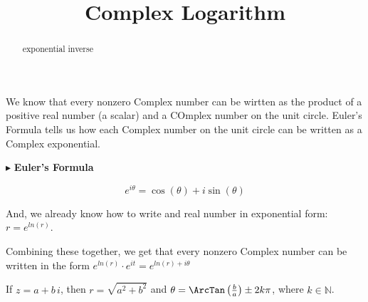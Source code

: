 \documentclass{ximera}
\title{Complex Logarithm}
\begin{document}
\begin{abstract}
exponential inverse
\end{abstract}
\maketitle





We know that every nonzero Complex number can be wirtten as the product of a positive real number (a scalar) and a COmplex number on the unit circle.  Euler's Formula tells us how each Complex number on the unit circle can be written as a Complex exponential.


$\blacktriangleright$ \textbf{Euler's Formula}


\[   e^{i \theta} = \cos(\theta) + i \sin(\theta)         \]


And, we already know how to write and real number in exponential form: $r = e^{ln(r)}$.  

Combining these together, we get that every nonzero Complex number can be written in the form  $e^{ln(r)} \cdot e^{i t} = e^{ln(r) + i \theta}$




If $z = a + b \, i$, then $r = \sqrt{a^2 + b^2}$ and $\theta = \ArcTan\left(\frac{b}{a}\right) \pm 2 k \pi$, where $k \in \mathbb{N}$.
\end{document}
